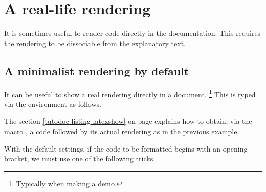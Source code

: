 \documentclass{tutodoc}
\begin{document}
\section{A real-life rendering}
\label{tutodoc-showcase}

It is sometimes useful to render code directly in the documentation. This requires the rendering to be dissociable from the explanatory text.



\subsection{A minimalist rendering by default}

\begin{tdocexa}
    It can be useful to show a real rendering directly in a document.%
    \footnote{
        Typically when making a demo.
    }
    This is typed via the environment  as follows.

\end{tdocexa}


\begin{tdocrem}
    The section \ref{tutodoc-listing-latexshow} on page \pageref{tutodoc-listing-latexshow} explains how to obtain, via the macro , a code followed by its actual rendering as in the previous example.
\end{tdocrem}


\begin{tdocwarn}
    With the default settings, if the code to be formatted begins with an opening bracket, we must use one of the following tricks.

\end{tdocwarn}
\end{document}

